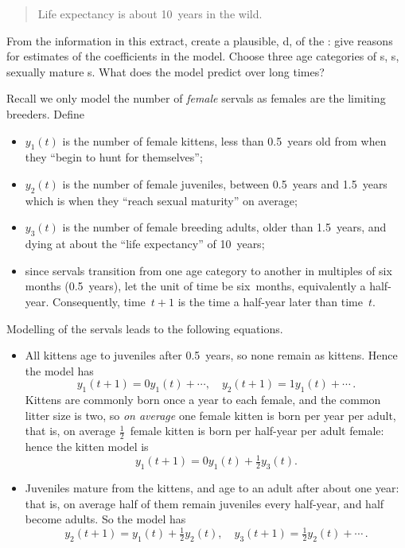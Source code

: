 \begin{example}
\begin{quote}
Life expectancy is about 10~years in the wild.
\end{quote}
From the information in this extract, create a plausible, d,   of the : give reasons for estimates of the coefficients in the model.
Choose three age categories of s, s, sexually mature s.
What does the model predict over long times?
\begin{solution} 
Recall we only model the number of \emph{female} servals as females are the limiting breeders.
Define 
\begin{itemize}
\item \(y_1(t)\) is the number of female kittens, less than 0.5~years old from when they ``begin to hunt for themselves'';
\item \(y_2(t)\) is the number of female juveniles, between 0.5~years and 1.5~years which is when they ``reach sexual maturity'' on average;
\item \(y_3(t)\) is the number of female breeding adults, older than 1.5~years, and dying at about the ``life expectancy'' of 10~years;
\item since servals transition from one age category to another in multiples of six months (0.5~years), let the unit of time be six~months, equivalently a half-year.  
Consequently, time~\(t+1\) is the time a half-year later than time~\(t\).
\end{itemize}
Modelling of the servals leads to the following equations.
\begin{itemize}
\item All kittens age to juveniles after 0.5~years, so none remain as kittens.  
Hence the model has 
\begin{equation*}
y_1(t+1)=0y_1(t)+\cdots,\quad
y_2(t+1)=1y_1(t)+\cdots\,.
\end{equation*}
Kittens are commonly born once a year to each female, and the common litter size is two, so \emph{on average} one female kitten is born per year per adult, that is, on average \(\frac12\)~female kitten is born per half-year per adult female: hence the kitten model is
\begin{equation*}
y_1(t+1)=0y_1(t)+\tfrac12y_3(t).
\end{equation*}

\item Juveniles mature from the kittens, and age to an adult after about one year: that is, on average half of them remain juveniles every half-year, and half become adults.
So the model has 
\begin{equation*}
y_2(t+1)=y_1(t)+\tfrac12y_2(t),\quad
y_3(t+1)=\tfrac12y_2(t)+\cdots\,.
\end{equation*}


\end{itemize}
\end{solution}
\end{example}
